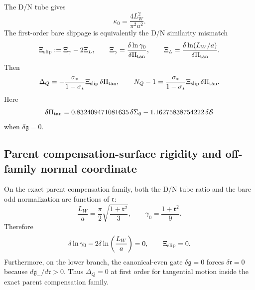 The D/N tube gives
\begin{equation}
\label{eq:app-part04-kappa0-LW}
\kappa_0=\frac{4L_W^2}{\pi^2a^2}.
\end{equation}
The first-order bare slippage is equivalently the D/N similarity mismatch
\begin{equation}
\label{eq:app-part04-Xislip-def}
\Xi_{\rm slip}:=\Xi_\gamma-2\Xi_L,
\qquad
\Xi_\gamma=\frac{\delta\ln\gamma_0}{\delta\Pi_{\rm tan}},
\qquad
\Xi_L=\frac{\delta\ln(L_W/a)}{\delta\Pi_{\rm tan}}.
\end{equation}
Then
\begin{equation}
\label{eq:app-part04-DeltaQ-Xislip}
\Delta_Q
=-\frac{\sigma_*}{1-\sigma_*}\Xi_{\rm slip}\,\delta\Pi_{\rm tan},
\qquad
N_Q-1
=\frac{\sigma_*}{1-\sigma_*}\Xi_{\rm slip}\,\delta\Pi_{\rm tan}.
\end{equation}
Here
\begin{equation}
\label{eq:app-part04-deltaPi-tan}
\delta\Pi_{\rm tan}
=0.832409471081635\,\delta\Sigma_0
-1.16275838754222\,\delta\mathcal S
\end{equation}
when \(\delta\mathfrak g=0\).

\subsection{Parent compensation-surface rigidity and off-family normal coordinate}
\label{subsec:app-part04-off-family-normal-coordinate}

On the exact parent compensation family, both the D/N tube ratio and the bare odd normalization are functions of \(\mathfrak r\):
\begin{equation}
\label{eq:app-part04-parent-family-LW-gamma}
\frac{L_W}{a}=\frac{\pi}{2}\sqrt{\frac{1+\mathfrak r^2}{3}},
\qquad
\gamma_0=\frac{1+\mathfrak r^2}{9}.
\end{equation}
Therefore
\begin{equation}
\label{eq:app-part04-Xislip-zero-parent-family}
\delta\ln\gamma_0-2\delta\ln\left(\frac{L_W}{a}\right)=0,
\qquad
\Xi_{\rm slip}=0.
\end{equation}
Furthermore, on the lower branch, the canonical-even gate \(\delta\mathfrak g=0\) forces \(\delta\mathfrak r=0\) because \(d\mathfrak g_-/d\mathfrak r>0\).  Thus \(\Delta_Q=0\) at first order for tangential motion inside the exact parent compensation family.

